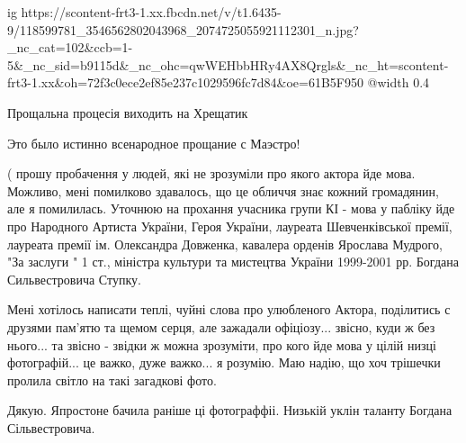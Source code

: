  
 
 
 
 

\ifcmt
  ig https://scontent-frt3-1.xx.fbcdn.net/v/t1.6435-9/118599781_3546562802043968_2074725055921112301_n.jpg?_nc_cat=102&ccb=1-5&_nc_sid=b9115d&_nc_ohc=qwWEHbbHRy4AX8Qrgls&_nc_ht=scontent-frt3-1.xx&oh=72f3c0ece2ef85e237c1029596fc7d84&oe=61B5F950
  @width 0.4
\fi


Прощальна процесія виходить на Хрещатик

Это было истинно всенародное прощание с Маэстро!


( прошу пробачення у людей, які не зрозуміли про якого актора йде мова.
Можливо, мені помилково здавалось, що це обличчя знає кожний громадянин, але я
помилилась. Уточнюю на прохання учасника групи КІ - мова у пабліку йде про
Народного Артиста України, Героя України, лауреата Шевченківської премії,
лауреата премії ім. Олександра Довженка, кавалера орденів Ярослава Мудрого, "За
заслуги " 1 ст., міністра культури та мистецтва України 1999-2001 рр. Богдана
Сильвестровича Ступку.

Мені хотілось написати теплі, чуйні слова про улюбленого Актора, поділитись с
друзями пам'ятю та щемом серця, але зажадали офіціозу... звісно, куди ж без
нього... та звісно - звідки ж можна зрозуміти, про кого йде мова у цілій низці
фотографій... це важко, дуже важко... я розумію. Маю надію, що хоч трішечки
пролила світло на такі загадкові фото.


Дякую. Япростоне бачила раніше ці фотограффіі. Низькій уклін таланту Богдана Сільвестровича.
